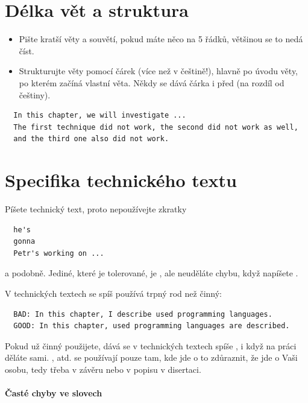 \section*{Délka vět a struktura}

\begin{itemize}
  \item{Pište kratší věty a souvětí, pokud máte něco na 5 řádků, většinou se to nedá číst.}
  \item{Strukturujte věty pomocí čárek (více než v češtině!), hlavně po úvodu věty, po kterém začíná vlastní věta. Někdy se dává čárka i před  (na rozdíl od češtiny).}
\end{itemize}
\begin{verbatim}
  In this chapter, we will investigate ... 
  The first technique did not work, the second did not work as well, 
  and the third one also did not work. 
\end{verbatim}

\section*{Specifika technického textu}

Píšete technický text, proto nepoužívejte zkratky
\begin{verbatim}
  he's
  gonna
  Petr's working on ...
\end{verbatim}
\noindent a podobně. Jediné, které je tolerované, je , ale neuděláte chybu, když napíšete . 

\begin{samepage}
\noindent V technických textech se spíš používá trpný rod než činný: 
\begin{verbatim}
  BAD: In this chapter, I describe used programming languages. 
  GOOD: In this chapter, used programming languages are described.
\end{verbatim}
\end{samepage}

Pokud už činný použijete, dává se v technických textech spíše , i když na práci děláte sami. ,  atd. se používají pouze tam, kde jde o to zdůraznit, že jde o Vaši osobu, tedy třeba v závěru nebo v popisu  v disertaci.

\paragraph{Časté chyby ve slovech}

